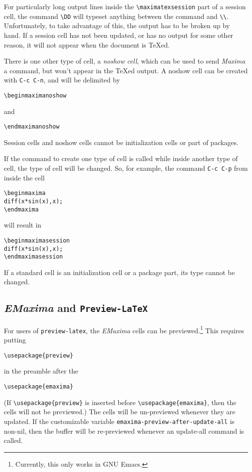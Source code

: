 \documentclass{article}
\newcommand{\emx}{\textsl{\sffamily EMaxima}}
\newcommand{\mx}{\textsl{\sffamily Maxima}}
\begin{document}
For particularly long output lines inside the \verb+\maximatexsession+
part of a session cell, the command \verb+\DD+ will typeset anything
between the command and \verb+\\+.  Unfortunately, to take advantage
of this, the output has to be broken up by hand.
If a session cell has not been updated, or has no output for some
other reason, it will not appear when the document is \TeX{}ed.

There is one other type of cell, a \emph{noshow cell}, which can be
used to send \mx{} a command, but won't appear in the \TeX{}ed
output. A noshow cell can be created with \texttt{C-c C-n}, and will
be delimited by
\begin{verbatim}
\beginmaximanoshow
\end{verbatim}
\noindent
and
\begin{verbatim}
\endmaximanoshow
\end{verbatim}

Session cells and noshow cells cannot be initialization cells or part of
packages.

If the command to create one type of cell is called while inside
another type of cell, the type of cell will be changed.  So, for
example, the command \texttt{C-c C-p} from inside the cell
\begin{verbatim}
\beginmaxima
diff(x*sin(x),x);
\endmaxima
\end{verbatim}
\noindent
will result in
\begin{verbatim}
\beginmaximasession
diff(x*sin(x),x);
\endmaximasession
\end{verbatim}
\noindent
If a standard cell is an initialization cell or a package part, its
type cannot be changed.

\subsection{\emx{} and \texttt{Preview-LaTeX}}

For users of \texttt{preview-latex}, the \emx{} cells can be
previewed.\footnote{Currently, this only works in GNU Emacs.}
This requires putting
\begin{verbatim}
\usepackage{preview}
\end{verbatim}
in the preamble after the
\begin{verbatim}
\usepackage{emaxima}
\end{verbatim}
(If \verb+\usepackage{preview}+ is inserted before
\verb+\usepackage{emaxima}+, then the cells will not be previewed.)
The cells will be un-previewed whenever they are updated.
If the customizable variable \texttt{emaxima-preview-after-update-all}
is non-nil, then the buffer will be re-previewed whenever an
update-all command is called.
\end{document}
